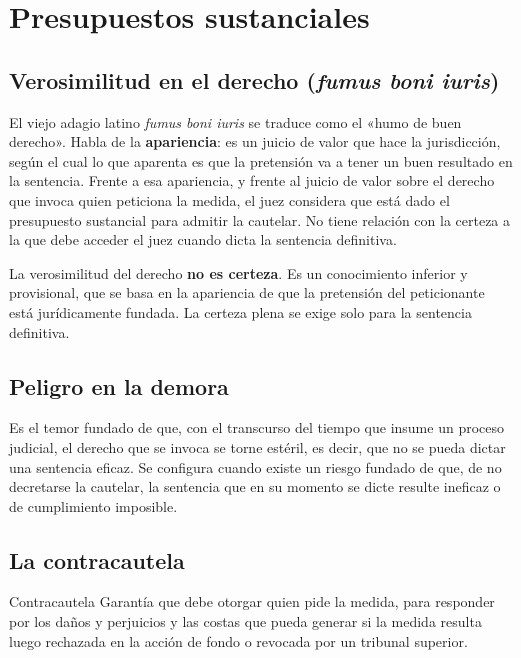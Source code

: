 \documentclass[12pt,oneside]{book}
\begin{document}
\section{Presupuestos sustanciales}

\subsection{Verosimilitud en el derecho (\textit{fumus boni iuris})}

El viejo adagio latino \textit{fumus boni iuris} se traduce como el «humo de buen derecho». Habla de la \textbf{apariencia}: es un juicio de valor que hace la jurisdicción, según el cual lo que aparenta es que la pretensión va a tener un buen resultado en la sentencia. Frente a esa apariencia, y frente al juicio de valor sobre el derecho que invoca quien peticiona la medida, el juez considera que está dado el presupuesto sustancial para admitir la cautelar. No tiene relación con la certeza a la que debe acceder el juez cuando dicta la sentencia definitiva.

\begin{important}
La verosimilitud del derecho \textbf{no es certeza}. Es un conocimiento inferior y provisional, que se basa en la apariencia de que la pretensión del peticionante está jurídicamente fundada. La certeza plena se exige solo para la sentencia definitiva.
\end{important}

\subsection{Peligro en la demora}

Es el temor fundado de que, con el transcurso del tiempo que insume un proceso judicial, el derecho que se invoca se torne estéril, es decir, que no se pueda dictar una sentencia eficaz. Se configura cuando existe un riesgo fundado de que, de no decretarse la cautelar, la sentencia que en su momento se dicte resulte ineficaz o de cumplimiento imposible.

\subsection{La contracautela}

\begin{definition}{Contracautela}
Garantía que debe otorgar quien pide la medida, para responder por los daños y perjuicios y las costas que pueda generar si la medida resulta luego rechazada en la acción de fondo o revocada por un tribunal superior.
\end{definition}
\end{document}
